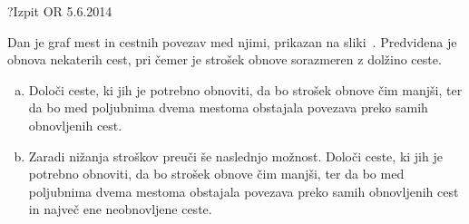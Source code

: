 \begin{naloga}{?}{Izpit OR 5.6.2014}
\begin{vprasanje}
Dan je graf mest in cestnih povezav med njimi, prikazan na sliki~\fig{}.
Predvidena je obnova nekaterih cest,
pri čemer je strošek obnove sorazmeren z dolžino ceste.

\begin{enumerate}[(a)]
\item Določi ceste, ki jih je potrebno obnoviti,
da bo strošek obnove čim manjši,
ter da bo med poljubnima dvema mestoma
obstajala povezava preko samih obnovljenih cest.

\item Zaradi nižanja stroškov preuči še naslednjo možnost.
Določi ceste, ki jih je potrebno obnoviti, da bo strošek obnove čim manjši,
ter da bo med poljubnima dvema mestoma obstajala povezava
preko samih obnovljenih cest in največ ene neobnovljene ceste.
\end{enumerate}

\begin{slika}
\pgfslika
{}
\end{slika}
\end{vprasanje}
\begin{odgovor}
\end{odgovor}
\end{naloga}
